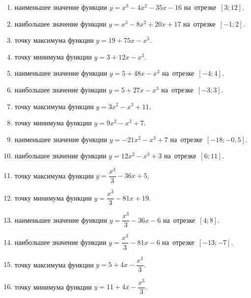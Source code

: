 \documentclass[a4paper,10pt]{article}
\begin{document}
\begin{enumerate}
\item {} наименьшее значение функции $y=x^3 -4x^2-35x-16$ на~отрезке~$\left[3;12\right]$.

\item {} наибольшее значение функции $y=x^3 -8x^2+20x+17$ на~отрезке~$\left[-1;2\right]$.

\item {} точку максимума функции $y=19+75x-x^3$.

\item {} точку минимума функции $y=3+12x-x^3$.

\item {} наименьшее значение функции $y=5+48x-x^3$ на~отрезке~$\left[-4;4\right]$.

\item {} наибольшее значение функции $y=5+27x-x^3$ на~отрезке~$\left[-3;3\right]$.

\item {} точку максимума функции $y=3x^2-x^3+11$.

\item {} точку минимума функции $y=9x^2-x^3+7$.

\item {} наименьшее значение функции $y=-21x^2-x^3+7$ на~отрезке~$\left[-18;-0,5\right]$.

\item {} наибольшее значение функции $y=12x^2-x^3+3$ на~отрезке~$\left[6;11\right]$.

\item {} точку максимума функции $y=\dfrac{x^3}{3} -36x+5$.

\item {} точку минимума функции $y=\dfrac{x^3}{3} -81x+19$.

\item {} наименьшее значение функции $y=\dfrac{x^3}{3} -36x-6$ на~отрезке~$\left[4;8\right]$.

\item {} наибольшее значение функции $y=\dfrac{x^3}{3} -81x-6$ на~отрезке~$\left[-13;-7\right]$.

\item {} точку максимума функции $y=5 +4x-\dfrac{x^3}{3}$.

\item {} точку минимума функции $y=11 +4x-\dfrac{x^3}{3}$.


\end{enumerate}
\end{document}
